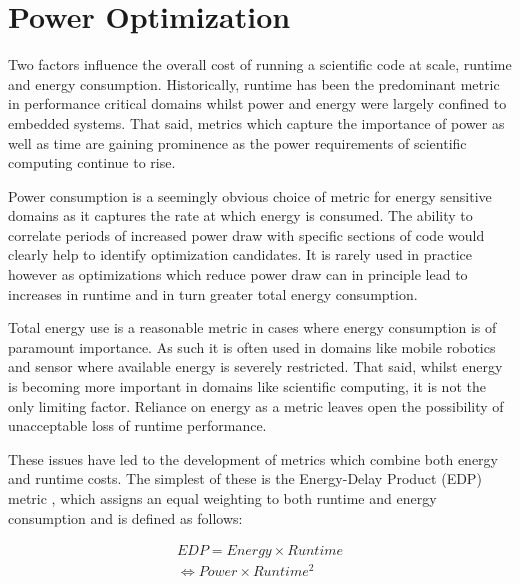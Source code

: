 \section{Power Optimization}
\label{sec:optimization}

Two factors influence the overall cost of running a scientific code at scale, runtime and energy consumption.
Historically, runtime has been the predominant metric in performance critical domains whilst power and energy were largely confined to embedded systems.
That said, metrics which capture the importance of power as well as time are gaining prominence as the power requirements of scientific computing continue to rise.



Power consumption is a seemingly obvious choice of metric for energy sensitive domains as it captures the rate at which energy is consumed.
The ability to correlate periods of increased power draw with specific sections of code would clearly help to identify optimization candidates.
It is rarely used in practice however as optimizations which reduce power draw can in principle lead to increases in runtime and in turn greater total energy consumption.

Total energy use is a reasonable metric in cases where energy consumption is of paramount importance.
As such it is often used in domains like mobile robotics and sensor where available energy is severely restricted.
That said, whilst energy is becoming more important in domains like scientific computing, it is not the only limiting factor. 
Reliance on energy as a metric leaves open the possibility of unacceptable loss of runtime performance.

These issues have led to the development of metrics which combine both energy and runtime costs.
The simplest of these is the Energy-Delay Product (EDP) metric \cite{gonzales:1995aa}, which assigns an equal weighting to both runtime and energy consumption and is defined as follows:

\begin{align}
  EDP = Energy \times Runtime \nonumber \\
      \Leftrightarrow Power \times Runtime^{2} 
  \label{eq:edp}
\end{align}

